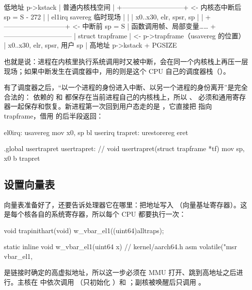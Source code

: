\begin{txtcode}
低地址   p->kstack
           |  普通内核栈空间
           |  +---------------------------+  <- 内核态中断后 sp = S - 272
           |  | el1irq savereg 临时现场   |
           |  | x0..x30, elr, spsr, sp    |
           |  +---------------------------+  <- 中断前 sp = S
           |  函数调用帧、局部变量……
           +------------------------------
           |  struct trapframe            |  <- p->trapframe（usavereg 的位置）
           |  x0..x30, elr, spsr, 用户 sp |
高地址   p->kstack + PGSIZE
\end{txtcode}

也就是说：进程在内核里执行系统调用时又被中断，会在同一个内核栈上再压一层  现场；如果中断发生在调度器中，用的则是这个 CPU 自己的调度器栈（）。

有了调度器之后，“以一个进程的身份进入中断、以另一个进程的身份离开”是完全合法的： 依赖的  和  都保存在当前进程自己的内核栈上，所以 、 必须和通用寄存器一起保存和恢复。新进程第一次回到用户态走的是 ，它直接把  指向 trapframe，借用  的后半段返回：

\begin{asmcode}
el0irq:
        usavereg
        mov x0, sp
        bl userirq
trapret:
        urestorereg
        eret

.global usertrapret
usertrapret:                    // void usertrapret(struct trapframe *tf)
        mov sp, x0
        b trapret
\end{asmcode}

\subsection{设置向量表}

向量表准备好了，还要告诉处理器它在哪里：把地址写入 （向量基址寄存器）。这是每个核各自的系统寄存器，所以每个 CPU 都要执行一次：

\begin{ccode}
void trapinithart(void)
{
  w_vbar_el1((uint64)alltraps);
}

static inline void w_vbar_el1(uint64 x)     // kernel/aarch64.h
{
  asm volatile("msr vbar_el1, %
}
\end{ccode}

 是链接时确定的高虚拟地址，所以这一步必须在 MMU 打开、跳到高地址之后进行。主核在  中依次调用 （只初始化 ）和 ；副核被唤醒后只调用 。


